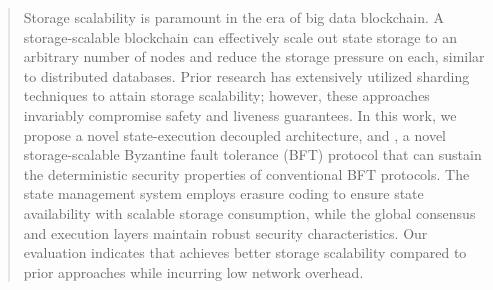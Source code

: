 \begin{abstract}
Storage scalability is paramount in the era of big data blockchain.
A storage-scalable blockchain can effectively scale out state storage to an arbitrary number of nodes and reduce the storage pressure on each, similar to distributed databases.
Prior research has extensively utilized sharding techniques to attain storage scalability; however, these approaches invariably compromise safety and liveness guarantees.
In this work, we propose a novel state-execution decoupled architecture, and \sys, a novel storage-scalable Byzantine fault tolerance (BFT) protocol that can sustain the deterministic security properties of conventional BFT protocols.
The state management system employs erasure coding to ensure state availability with scalable storage consumption, while the global consensus and execution layers maintain robust security characteristics.
Our evaluation indicates that \sys achieves better storage scalability compared to prior approaches while incurring low network overhead.
\end{abstract}